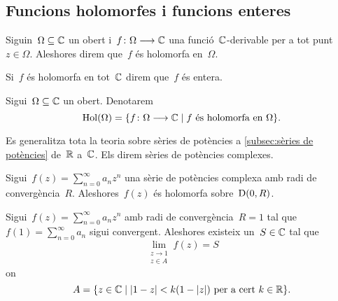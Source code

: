 \documentclass[../Apunts.tex]{subfiles}
\begin{document}
	\subsection{Funcions holomorfes i funcions enteres}
	\begin{definition}
		\label{def:funció holomorfa}
		Siguin~\(\Omega\subseteq\mathbb{C}\) un obert i~\(f\colon\Omega\longrightarrow\mathbb{C}\) una funció~\(\mathbb{C}\)-derivable per a tot punt~\(z\in\Omega\). Aleshores direm que~\(f\) és holomorfa en~\(\Omega\).
		
		Si~\(f\) és holomorfa en tot~\(\mathbb{C}\) direm que~\(f\) és entera.
	\end{definition}
	\begin{notation}
		Sigui~\(\Omega\subseteq\mathbb{C}\) un obert. Denotarem
		\[\operatorname{Hol}(\Omega)=\{f\colon\Omega\longrightarrow\mathbb{C}\mid f\text{ és holomorfa en }\Omega\}.\]
	\end{notation}
	\begin{note}
		Es generalitza tota la teoria sobre sèries de potències a \ref{subsec:sèries de potències} de~\(\mathbb{R}\) a~\(\mathbb{C}\). Els direm sèries de potències complexes.
	\end{note}
	\begin{example}
		Sigui~\(f(z)=\sum_{n=0}^{\infty}a_{n}z^{n}\) una sèrie de potències complexa amb radi de convergència~\(R\). Aleshores~\(f(z)\) és holomorfa sobre~\(\operatorname{D}(0,R)\).
	\end{example}
	\begin{theorem}
		\label{thm:Teorema d'Abel per sèries de potències complexes}
		Sigui~\(f(z)=\sum_{n=0}^{\infty}a_{n}z^{n}\) amb radi de convergència~\(R=1\) tal que~\(f(1)=\sum_{n=0}^{\infty}a_{n}\) sigui convergent. Aleshores existeix un~\(S\in\mathbb{C}\) tal que
		\[\lim_{\substack{z\to1\\z\in A}}f(z)=S\]
		on
		\begin{equation}
			\label{eq:1:thm:Teorema d'Abel per sèries de potències complexes}
			A=\{z\in\CC\mid\abs{1-z}<k(1-\abs{z})\text{ per a cert }k\in\RR\}.
		\end{equation}
	\end{theorem}
\end{document}
